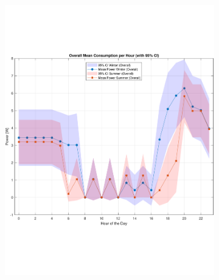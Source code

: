 \begin{figure}[H]
    \begin{subfigure}[t]{0.52\linewidth} 
        \vspace*{0pt} %
        \centering
        \includegraphics[width=\linewidth, height=\LeftImageHeight, keepaspectratio]{photos/Mean_consumption_winter&summer_all_systems_with_95CI.pdf}
    \end{subfigure}\hfill %
    \begin{minipage}[t]{0.45\linewidth} 
        \vspace*{0pt} %
        \centering 
        \begin{subfigure}{\linewidth} 

\end{subfigure}
\end{minipage}
\end{figure}
